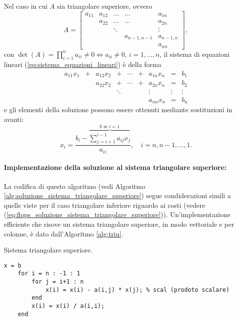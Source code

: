 Nel caso in cui $A$ sia triangolare superiore, ovvero
\begin{equation*}
    A= 
\begin{bmatrix}
   a_{11} & a_{12} & \hdots & \hdots & a_{1n}\\
          & a_{22} & \hdots & \hdots & a_{2n}\\
          && \ddots & &\vdots\\
          &&& a_{n-1,n-1} & a_{n-1,n}\\
          & & & & a_{nn}
\end{bmatrix},
\end{equation*}
con $\det(A)=\prod_{i=1}^n a_{ii}\neq 0\iff a_{ii}\neq 0,\, i = 1,\hdots, n$, il sistema di equazioni lineari (\ref{eq:sistema_equazioni_lineari}) è della forma
\begin{equation*}
    \begin{matrix}
        a_{11} x_1 &+& a_{12} x_2 &+& \cdots &+& a_{1n} x_n &=& b_1\\
        && a_{22}x_2 &+& \cdots &+& a_{2n}x_n &=& b_2\\
        && &\ddots& && \vdots &\vdots& \vdots\\
        && && && a_{nn}x_n &=& b_n
    \end{matrix}
\end{equation*}
e gli elementi della soluzione possono essere ottenuti mediante sostituzioni in avanti:
\begin{equation}\label{eq:solSistTriangSup}
    x_i=\frac{b_i-\overbrace{\sum_{j=i+1}^{i-1}a_{ij}x_j}^{\text{0 se $i=1$}}}{a_{ii}},\quad i=n, n-1, \hdots, 1.
\end{equation}

\paragraph{Implementazione della soluzione al sistema triangolare superiore:} La codifica di questo algoritmo (vedi Algoritmo  \ref{alg:soluzione_sistema_triangolare_superiore}) segue condiderazioni simili a quelle viste per il caso triangolare inferiore riguardo ai costi (vedere (\ref{eq:flops_soluzione_sistema_triangolare_superiore})). Un'implementazione efficiente che risove un sistema triangolare superiore, in modo vettoriale e per colonne, è dato dall'Algoritmo \ref{alg:triu}.

\begin{algorithm}\caption{Sistema triangolare superiore.}
\label{alg:soluzione_sistema_triangolare_superiore}
    \begin{lstlisting}[style=Matlab-editor]
    x = b
    for i = n : -1 : 1
        for j = i+1 : n
            x(i) = x(i) - a(i,j) * x(j); % scal (prodoto scalare)
        end
        x(i) = x(i) / a(i,i);
    end
    \end{lstlisting}
\end{algorithm}

